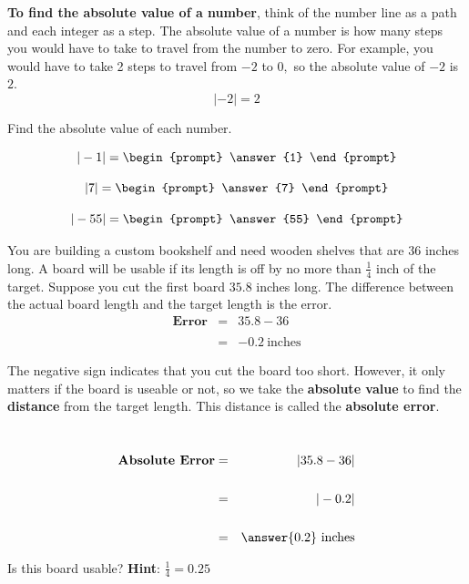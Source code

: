 \documentclass{ximera}[font=12pt]
\begin{document}
\textbf{To find the absolute value of a number}, think of the number line as a path and each integer as a step. The 
absolute value of a number is how many steps you would have to take to travel from the number to zero.  For example, 
you would have to take 2 steps to travel from $-2$ to $0,$ so the absolute value of $-2$ is $2.$
\[ |-2| = 2 \]


\begin{problem}
Find the absolute value of each number.

\[ |-1| = \begin{prompt} \answer{1} \end{prompt} \]

\[ |7| = \begin{prompt} \answer{7} \end{prompt} \]


\[ |-55| = \begin{prompt} \answer{55} \end{prompt} \]

\end{problem}



\begin{problem}
You are building a custom bookshelf and need wooden shelves that are $36$ inches long.  A board will be usable if its length is off by no more than 
$\textstyle \frac{1}{4}$ inch of the target.  Suppose you cut the first board $35.8$ inches long.  The difference 
between the actual board length and the target length is the error.
\begin{eqnarray*}
  \textbf{Error} &=& 35.8 - 36 \\
        & & \\
        &=& -0.2 \  \textrm{inches}
\end{eqnarray*}

The negative sign indicates that you cut the board too short.  However, it only matters if the board is useable or not, so we take the \textbf{absolute value} 
to find the \textbf{distance} from the target length.  This distance is called the \textbf{absolute error}.

~ \\[1em]


\begin{eqnarray*}
\textbf{Absolute Error} &=& |35.8 - 36| \\
    & & \\
    &=& |-0.2| \\
    & & \\
    &=&  \answer{0.2} \ \textrm{inches}
\end{eqnarray*}


Is this board usable? \textbf{Hint}: $\textstyle \frac{1}{4} = 0.25$

\begin{multipleChoice}
\end{multipleChoice}


\end{problem}
\end{document}

